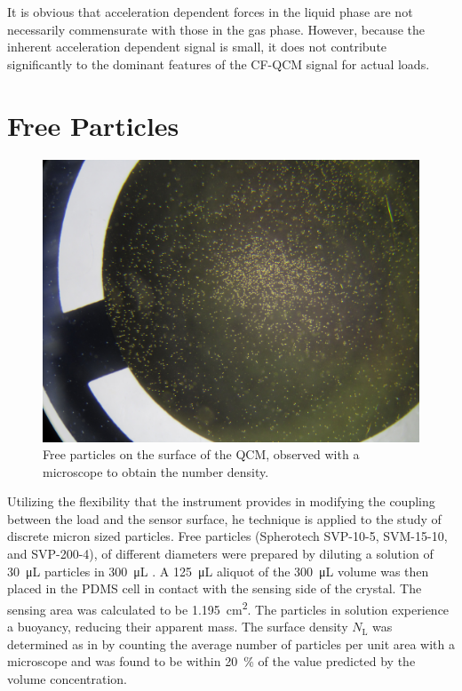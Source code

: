 It is obvious that acceleration dependent forces in the liquid
phase are not necessarily commensurate with those in the gas phase.
However, because the inherent acceleration dependent signal is small, it
does not contribute significantly to the dominant features of the CF-QCM
signal for actual loads.

\section{Free Particles}
\begin{figure}
\centering
\includegraphics[keepaspectratio,width=12cm]{qcm/figures/qcm_beadssurface.jpg}
\caption{Free particles on the surface of the QCM, observed with a
microscope to obtain the number density.}
\label{fig:countparticles}
\end{figure}
Utilizing the flexibility that the instrument provides in modifying the
coupling between the load and the sensor surface, he technique is applied 
to the study of discrete micron sized particles.  
Free particles (Spherotech SVP-10-5, SVM-15-10, and SVP-200-4), of
different diameters were prepared by diluting a solution of
\SI{30}{\micro\liter} particles in \SI{300}{\micro\liter} .  A
\SI{125}{\micro\liter} aliquot of the \SI{300}{\micro\liter} volume was
then placed in the PDMS cell in contact with the sensing side of the
crystal.  The sensing area was calculated to be
\SI{1.195}{\centi\meter\squared}.  The particles in solution experience a
buoyancy, reducing their apparent mass. The surface density
$N_\mathrm{L}$ was determined as in  by counting the average number of particles
per unit area with a microscope and was found to be within
\SI{20}{\percent} of the value predicted by the volume concentration.

